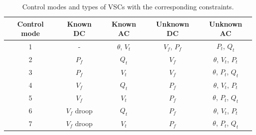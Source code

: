 \documentclass[11pt]{article}
\begin{document}
	\begin{table}[!htb]\centering
		\caption{Control modes and types of VSCs with the corresponding constraints.}
		\begin{tabular}{ccccc}
			\hline
			\textbf{Control mode} & \textbf{Known DC} & \textbf{Known AC} & \textbf{Unknown DC} & \textbf{Unknown AC} \\
			\hline
			\hline
			1 & - & $\theta$, $V_t$ & $V_f$, $P_f$ & $P_t$, $Q_t$ \\
			2 & $P_f$ & $Q_t$ & $V_f$ & $\theta$, $V_t$, $P_t$ \\
			3 & $P_f$ & $V_t$ & $V_f$ & $\theta$, $P_t$, $Q_t$ \\
			4 & $V_f$ & $Q_t$ & $P_f$ & $\theta$, $V_t$, $P_t$ \\
			5 & $V_f$ & $V_t$ & $P_f$ & $\theta$, $P_t$, $Q_t$ \\
			6 & $V_f$ droop & $Q_t$ & $P_f$ & $\theta$, $V_t$, $P_t$ \\
			7 & $V_f$ droop & $V_t$ & $P_f$ & $\theta$, $P_t$, $Q_t$ \\
			\hline
		\end{tabular}
		\label{table:vsc_map}
	\end{table}


	\printbibliography
\end{document}
